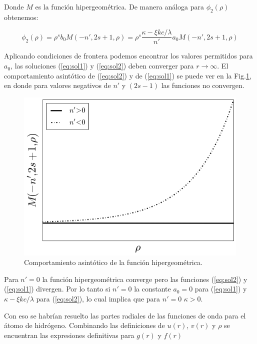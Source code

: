 \documentclass[a4paper, 12pt]{article} %
\begin{document}
Donde $M$ es la funci\'on hipergeom\'etrica. De manera an\'aloga para $\phi_2(\rho)$ obtenemos:

\begin{equation}\label{eq:sol2}
\phi_2(\rho) = \rho^s b_0 M(-n',2s+1,\rho) = \rho^s \dfrac{\kappa - \xi kc / \lambda}{n'} a_0 M(-n',2s+1,\rho)
\end{equation}

Aplicando condiciones de frontera podemos encontrar los valores permitidos para $a_0$, las soluciones
(\ref{eq:sol1}) y (\ref{eq:sol2}) deben converger para $r \rightarrow \infty$. El comportamiento 
asint\'otico de (\ref{eq:sol2}) y de (\ref{eq:sol1}) se puede ver en la Fig.\ref{fig:hypgeo}, 
en donde para valores negativos de $n'$ y $(2s-1)$ las funciones no convergen.

\begin{figure}[H]
\centering
\includegraphics[scale=0.4]{hypgeo.png}
\caption*{Comportamiento asint\'otico de la funci\'on hipergeom\'etrica.}
\label{fig:hypgeo}
\end{figure}  

Para $n' = 0$ la funci\'on hipergeom\'etrica converge pero las funciones (\ref{eq:sol2}) y (\ref{eq:sol1})
divergen. Por lo tanto si $n'=0$ la constante $a_0 = 0$ para (\ref{eq:sol1}) y $\kappa - \xi kc / \lambda$
para (\ref{eq:sol2}), lo cual implica que para $n'=0$ $\kappa > 0$. 





Con eso se habr\'ian resuelto las partes radiales de las funciones de onda para el \'atomo de hidr\'ogeno. Combinando las definiciones de $u(r)$, $v(r)$ y $\rho$ se encuentran las expresiones definitivas para $g(r)$ y $f(r)$
\end{document}

